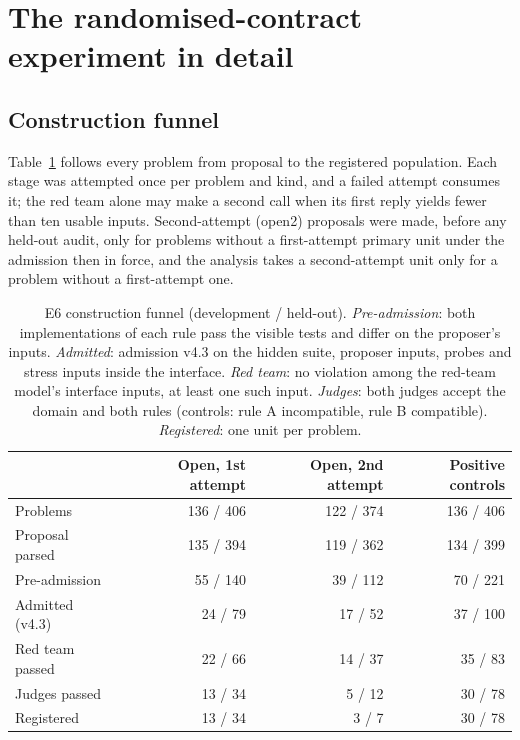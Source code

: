 \section{The randomised-contract experiment in detail}
\label{app:e6}

\subsection{Construction funnel}

Table~\ref{tab:e6-funnel} follows every problem from proposal to the registered population. Each stage was attempted
once per problem and kind, and a failed attempt consumes it; the red team alone may make a second call when its
first reply yields fewer than ten usable inputs. Second-attempt (open2) proposals were made, before any
held-out audit, only for problems without a first-attempt primary unit under the admission then in force, and the
analysis takes a second-attempt unit only for a problem without a first-attempt one.

\begin{table}[h]
\centering
\small
\caption{E6 construction funnel (development / held-out). \emph{Pre-admission}: both implementations of each rule
pass the visible tests and differ on the proposer's inputs. \emph{Admitted}: admission v4.3 on the hidden suite,
proposer inputs, probes and stress inputs inside the interface. \emph{Red team}: no violation among the red-team
model's interface inputs, at least one such input. \emph{Judges}: both judges accept the domain and both rules
(controls: rule A incompatible, rule B compatible). \emph{Registered}: one unit per problem.}
\label{tab:e6-funnel}
\begin{tabular}{lrrr}
\toprule
 & Open, 1st attempt & Open, 2nd attempt & Positive controls \\
\midrule
Problems & 136 / 406 & 122 / 374 & 136 / 406 \\
Proposal parsed & 135 / 394 & 119 / 362 & 134 / 399 \\
Pre-admission & 55 / 140 & 39 / 112 & 70 / 221 \\
Admitted (v4.3) & 24 / 79 & 17 / 52 & 37 / 100 \\
Red team passed & 22 / 66 & 14 / 37 & 35 / 83 \\
Judges passed & 13 / 34 & 5 / 12 & 30 / 78 \\
Registered & 13 / 34 & 3 / 7 & 30 / 78 \\
\bottomrule
\end{tabular}
\end{table}

